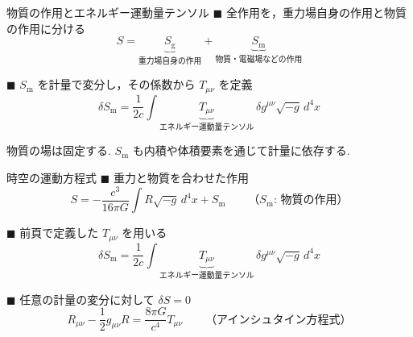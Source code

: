 \documentclass[unicode, aspectratio=169, 12pt]{beamer}
\begin{document}
\begin{frame}{物質の作用とエネルギー運動量テンソル}
    $\blacksquare$ 全作用を，重力場自身の作用と物質の作用に分ける
    \begin{equation*}
        S = \underbrace{S_{\mathrm g}}_{\text{重力場自身の作用}}
          + \underbrace{S_{\mathrm m}}_{\text{物質・電磁場などの作用}}
    \end{equation*}

    \vspace{0.6em}
    $\blacksquare$ $S_{\mathrm m}$ を計量で変分し，その係数から $T_{\mu\nu}$ を定義
    \begin{equation*}
        \delta S_{\mathrm m}
        = \frac{1}{2c}\int
        \underbrace{T_{\mu\nu}}_{\text{エネルギー運動量テンソル}}
        \,\delta g^{\mu\nu}\sqrt{-g}\,d^4x
    \end{equation*}

    \vspace{0.4em}
    {\small 物質の場は固定する. $S_{\mathrm m}$ も内積や体積要素を通じて計量に依存する.}
\end{frame}

\begin{frame}{時空の運動方程式}
    $\blacksquare$ 重力と物質を合わせた作用
    \begin{equation*}
        S = -\frac{c^3}{16\pi G}\int R\sqrt{-g}\,d^4x + S_{\mathrm m}
        \qquad \text{（$S_{\mathrm m}$: 物質の作用）}
    \end{equation*}

    $\blacksquare$ 前頁で定義した $T_{\mu\nu}$ を用いる
    \begin{equation*}
        \delta S_{\mathrm m}
        = \frac{1}{2c}\int
        \underbrace{T_{\mu\nu}}_{\text{エネルギー運動量テンソル}}
        \,\delta g^{\mu\nu}\sqrt{-g}\,d^4x
    \end{equation*}

    $\blacksquare$ 任意の計量の変分に対して $\delta S=0$
    \begin{equation*}
        \boxed{R_{\mu\nu}-\frac{1}{2}g_{\mu\nu}R
        = \frac{8\pi G}{c^4}T_{\mu\nu}}
        \qquad \text{（アインシュタイン方程式）}
    \end{equation*}
\end{frame}
\end{document}

